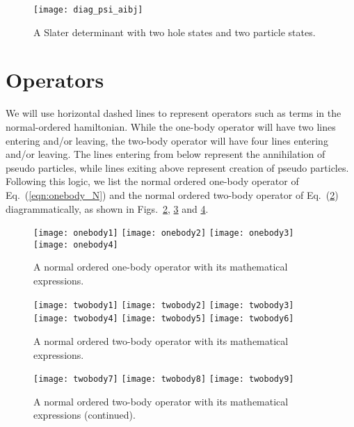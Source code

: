 \begin{figure}[p]
    \centering
    \texttt{[image: diag\_psi\_aibj]}
    \caption{A Slater determinant with two hole states and two particle states.}
    \label{fig:diag_psi_aibj}
\end{figure}

\FloatBarrier

\section{Operators}

We will use horizontal dashed lines to represent operators such as
terms in the normal-ordered hamiltonian. While the one-body operator
will have two lines entering and/or leaving, the two-body operator
will have four lines entering and/or leaving. The lines entering from
below represent the annihilation of pseudo particles, while lines
exiting above represent creation of pseudo particles. Following this
logic, we list the normal ordered one-body operator  of Eq.~(\ref{eqn:onebody_N}) 
and the normal ordered two-body operator
of Eq.~(\ref{fig:onebody}) diagrammatically, as shown in Figs.~\ref{fig:onebody},
\ref{fig:twobody1} and \ref{fig:twobody2}.
\begin{figure}[p]
    \centering
    \texttt{[image: onebody1]}
    \texttt{[image: onebody2]}
    \texttt{[image: onebody3]}
    \texttt{[image: onebody4]}
    \caption{A normal ordered one-body operator with its mathematical expressions.}
    \label{fig:onebody}
\end{figure}

\begin{figure}[p]
    \centering
    \texttt{[image: twobody1]}
    \texttt{[image: twobody2]}
    \texttt{[image: twobody3]}
    \texttt{[image: twobody4]}
    \texttt{[image: twobody5]}
    \texttt{[image: twobody6]}
    \caption{A normal ordered two-body operator with its mathematical expressions.}
    \label{fig:twobody1}
\end{figure}

\begin{figure}[p]
    \centering
    \texttt{[image: twobody7]}
    \texttt{[image: twobody8]}
    \texttt{[image: twobody9]}
    \caption{A normal ordered two-body operator with its mathematical expressions (continued).}
    \label{fig:twobody2}
\end{figure}


